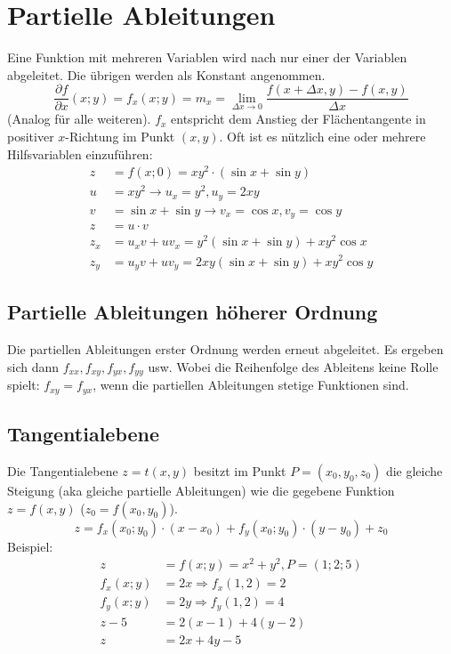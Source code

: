 \section{Partielle Ableitungen}
Eine Funktion mit mehreren Variablen wird nach nur einer der Variablen abgeleitet. Die übrigen werden als Konstant angenommen.
\begin{equation*}
	\frac{\partial f}{\partial x} (x; y)= f_x(x; y) = m_x = \lim_{\Delta x \rightarrow 0} \frac{f(x + \Delta x, y) - f(x, y)}{\Delta x}
\end{equation*}
(Analog für alle weiteren).
$f_x$ entspricht dem Anstieg der Flächentangente in positiver $x$-Richtung im Punkt $(x, y)$.
Oft ist es nützlich eine oder mehrere Hilfsvariablen einzuführen:
\begin{align*}
	z& = f(x; 0) = xy^2 \cdot (\sin x + \sin y)\\
	u& = xy^2 \rightarrow u_x = y^2, u_y = 2xy\\
	v& = \sin x + \sin y \rightarrow v_x = \cos x, v_y = \cos y\\
	z& = u \cdot v\\
	z_x& = u_xv + uv_x = y^2(\sin x + \sin y) + xy^2 \cos x\\
	z_y& = u_yv + uv_y = 2xy (\sin x + \sin y) + xy^2 \cos y
\end{align*}

\subsection{Partielle Ableitungen höherer Ordnung}
Die partiellen Ableitungen erster Ordnung werden erneut abgeleitet.
Es ergeben sich dann $f_{xx}, f_{xy}, f_{yx}, f_{yy}$ usw. Wobei die Reihenfolge des Ableitens keine Rolle spielt: $f_{xy} = f_{yx}$, wenn die partiellen Ableitungen stetige Funktionen sind.


\subsection{Tangentialebene}
Die Tangentialebene $z = t(x, y)$ besitzt im Punkt $P = (x_0, y_0, z_0)$ die gleiche Steigung (aka gleiche partielle Ableitungen) wie die gegebene Funktion $z = f(x, y)$ ($z_0 = f(x_0, y_0)$).
\begin{equation*}
	z = f_x(x_0; y_0) \cdot (x - x_0) + f_y(x_0; y_0) \cdot (y - y_0) + z_0
\end{equation*}
Beispiel:
\begin{align*}
	z& = f(x; y) = x^2 + y^2, P = (1; 2; 5)\\
	f_x(x; y)& = 2x \Rightarrow f_x(1, 2) = 2\\
	f_y(x; y)& = 2y \Rightarrow f_y(1, 2) = 4\\
	z - 5& = 2 (x - 1) + 4 (y - 2)\\
	z & = 2x + 4y - 5
\end{align*}

